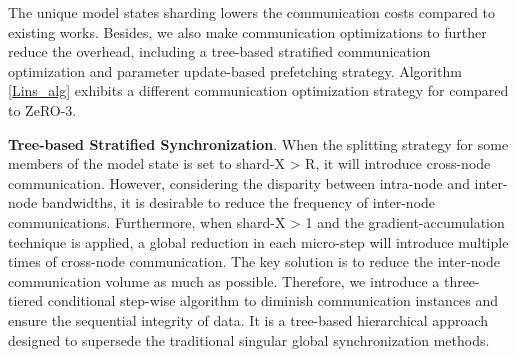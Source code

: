 \vspace{10pt}

The unique model states sharding lowers the communication costs compared to existing works. Besides, we also make communication optimizations to further reduce the overhead, including a tree-based stratified communication optimization and parameter update-based prefetching strategy. Algorithm \ref{Lins_alg} exhibits a different communication optimization strategy for \SysName compared to ZeRO-3.




\noindent\textbf{Tree-based Stratified Synchronization}.
\label{treeSync}
When the splitting strategy for some members of the model state is set to shard-X > R, it will introduce cross-node communication. 
However, considering the disparity between intra-node and inter-node bandwidths, it is desirable to reduce the frequency of inter-node communications. Furthermore, when shard-X > 1 and the gradient-accumulation technique \cite{GradAccumulate} is applied, a global reduction in each micro-step will introduce multiple times of cross-node communication. 
The key solution is to reduce the inter-node communication volume as much as possible. 
Therefore, we introduce a three-tiered conditional step-wise algorithm to diminish communication instances and ensure the sequential integrity of data. It is a tree-based hierarchical approach designed to supersede the traditional singular global synchronization methods. 

